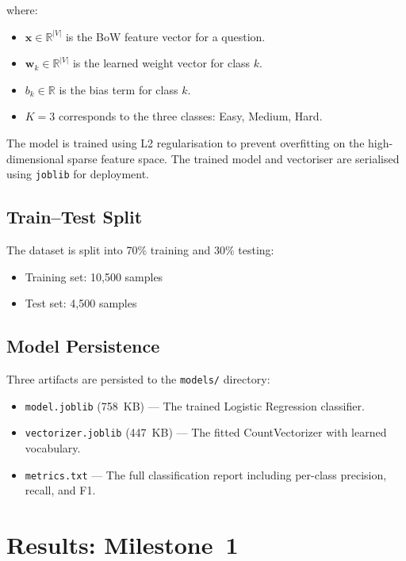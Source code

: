 \documentclass[12pt, a4paper]{article}
\begin{document}
where:
\begin{itemize}[noitemsep]
    \item $\mathbf{x} \in \mathbb{R}^{|V|}$ is the BoW feature vector for a question.
    \item $\mathbf{w}_k \in \mathbb{R}^{|V|}$ is the learned weight vector for class $k$.
    \item $b_k \in \mathbb{R}$ is the bias term for class $k$.
    \item $K = 3$ corresponds to the three classes: Easy, Medium, Hard.
\end{itemize}

The model is trained using L2 regularisation to prevent overfitting on the high-dimensional sparse feature space. The trained model and vectoriser are serialised using \texttt{joblib} \citep{joblib} for deployment.

\subsection{Train--Test Split}

The dataset is split into 70\% training and 30\% testing:
\begin{itemize}[noitemsep]
    \item Training set: 10{,}500 samples
    \item Test set: 4{,}500 samples
\end{itemize}

\subsection{Model Persistence}

Three artifacts are persisted to the \texttt{models/} directory:
\begin{itemize}[noitemsep]
    \item \texttt{model.joblib} (758~KB) --- The trained Logistic Regression classifier.
    \item \texttt{vectorizer.joblib} (447~KB) --- The fitted CountVectorizer with learned vocabulary.
    \item \texttt{metrics.txt} --- The full classification report including per-class precision, recall, and F1.
\end{itemize}

\section{Results: Milestone~1}
\label{sec:results-m1}
\end{document}
